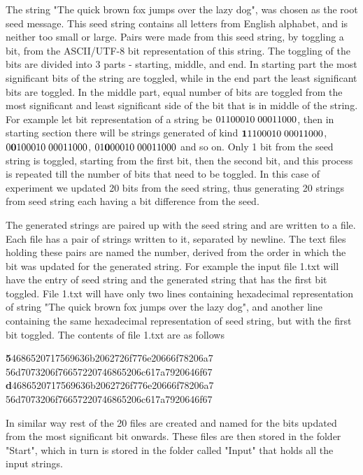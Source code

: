 The string "The quick brown fox jumps over the lazy dog", was chosen as the root seed message. This seed string
contains all letters from English alphabet, and is neither too small or large. Pairs were made from this seed
string, by toggling a bit, from the ASCII/UTF-8 bit representation of this string. The toggling of the bits are
divided into 3 parts - starting, middle, and end. In starting part the most significant bits of the string are
toggled, while in the end part the least significant bits are toggled. In the middle part, equal number of bits 
are toggled from the most significant and least significant side of the bit that is in middle of the string. For
example let bit representation of a string be $01100010\thickspace00011000$, then in starting section there 
will be strings generated of kind ${\bf 1}1100010\thickspace00011000$, $0{\bf 0}100010\thickspace00011000$,
$01{\bf 0}00010\thickspace00011000$ and so on. Only 1 bit from the seed string is toggled, starting from the
first bit, then the second bit, and this process is repeated till the number of bits that need to be toggled. 
In this case of experiment we updated 20 bits from the seed string, thus generating 20 strings from seed string 
each having a bit difference from the seed.

The generated strings are paired up with the seed string and are written to a file. Each file has a pair of
strings written to it, separated by newline. The text files holding these pairs are named the number, derived
from the order in which the bit was updated for the generated string. For example the input file 1.txt will
have the entry of seed string and the generated string that has the first bit toggled. File 1.txt will have 
only two lines containing hexadecimal representation of string "The quick brown fox jumps over the lazy dog",
and another line containing the same hexadecimal representation of seed string, but with the first bit toggled.
The contents of file 1.txt are as follows 
\begin{center}{\bf 5}4686520717569636b2062726f776e20666f78206a7 \\
56d7073206f76657220746865206c617a7920646f67 \\ 
\vspace{2mm}
{\bf d}4686520717569636b2062726f776e20666f78206a7 \\
56d7073206f76657220746865206c617a7920646f67\end{center}

In similar way rest of the 20 files are created and named for the bits updated from the most significant 
bit onwards. These files are then stored in the folder "Start", which in turn is stored in the folder 
called "Input" that holds all the input strings.

